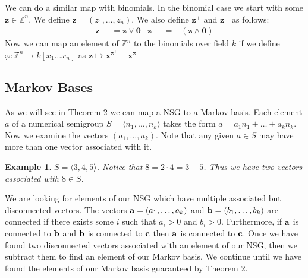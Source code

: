 \documentclass[11pt]{amsart}
\theoremstyle{plain}
\newtheorem{exa}{Example}
\theoremstyle{definition}
\begin{document}
We can do a similar map with binomials.
In the binomial case we start with some $\mathbf{z}\in \mathbb{Z}^n$.
We define $\mathbf{z}=(z_1,\dots,z_n)$.
We also define $\mathbf{z}^+$ and $\mathbf{z}^-$ as follows:
\begin{align*}
  \mathbf{z}^+&=\mathbf{z}\vee\mathbf{0}&
  \mathbf{z}^-&=-(\mathbf{z}\wedge\mathbf{0})
\end{align*}
Now we can map an element of $\mathbb{Z}^n$ to the binomials over field $k$ if
we define $\varphi:\mathbb{Z}^n\to k[x_1\dots x_n]$ as $\mathbf{z}\mapsto
\mathbf{x}^{\mathbf{z}^+}-\mathbf{x}^{\mathbf{z}^-}$

\subsection{Markov Bases}
As we will see in Theorem 2 we can map a NSG to a Markov
basis\cite{bernd}.
Each element $a$ of a numerical semigroup $S=\langle n_1,\dots,n_k\rangle$ takes
the form $a=a_1n_1+\dots+a_kn_k$. Now we examine the vectors $(a_1,\dots,a_k)$.
Note that any given $a\in S$ may have more than one vector associated with it.
\begin{exa}
  $S=\langle 3,4,5\rangle$. Notice that $8=2\cdot 4=3+5$. Thus we have two
  vectors associated with $8\in S$.
\end{exa}
We are looking for elements of our NSG which have multiple
associated but disconnected vectors. The vectors ${\bf a}=(a_1,\dots,a_k)$
and ${\bf b}=(b_1,\dots,b_k)$ are connected if there exists some $i$
such that $a_i>0$ and $b_i>0$. Furthermore, if ${\bf a}$ is connected to
${\bf b}$ and ${\bf b}$ is connected to ${\bf c}$ then ${\bf a}$ is connected to
${\bf c}$. Once we have found two disconnected vectors associated with an
element of our NSG, then we subtract them to find an element
of our Markov basis. We continue until we have found the elements of our Markov
basis guaranteed by Theorem 2.
\end{document}
